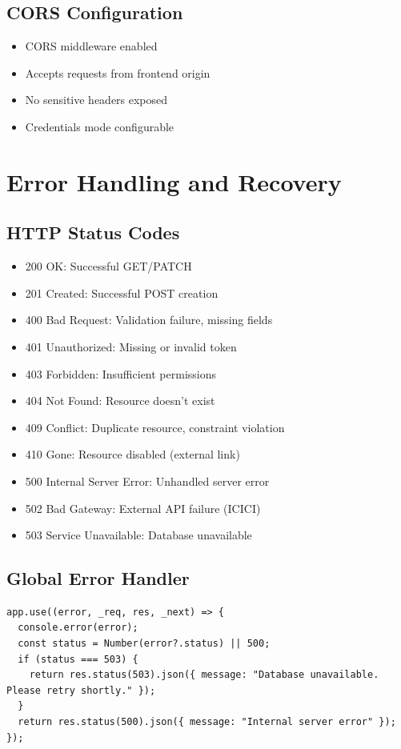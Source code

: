 \documentclass[12pt,a4paper]{article}
\begin{document}
\subsection{CORS Configuration}
\begin{itemize}
  \item CORS middleware enabled
  \item Accepts requests from frontend origin
  \item No sensitive headers exposed
  \item Credentials mode configurable
\end{itemize}

\section{Error Handling and Recovery}

\subsection{HTTP Status Codes}
\begin{itemize}
  \item 200 OK: Successful GET/PATCH
  \item 201 Created: Successful POST creation
  \item 400 Bad Request: Validation failure, missing fields
  \item 401 Unauthorized: Missing or invalid token
  \item 403 Forbidden: Insufficient permissions
  \item 404 Not Found: Resource doesn't exist
  \item 409 Conflict: Duplicate resource, constraint violation
  \item 410 Gone: Resource disabled (external link)
  \item 500 Internal Server Error: Unhandled server error
  \item 502 Bad Gateway: External API failure (ICICI)
  \item 503 Service Unavailable: Database unavailable
\end{itemize}

\subsection{Global Error Handler}
\begin{lstlisting}
app.use((error, _req, res, _next) => {
  console.error(error);
  const status = Number(error?.status) || 500;
  if (status === 503) {
    return res.status(503).json({ message: "Database unavailable. Please retry shortly." });
  }
  return res.status(500).json({ message: "Internal server error" });
});
\end{lstlisting}
\end{document}
